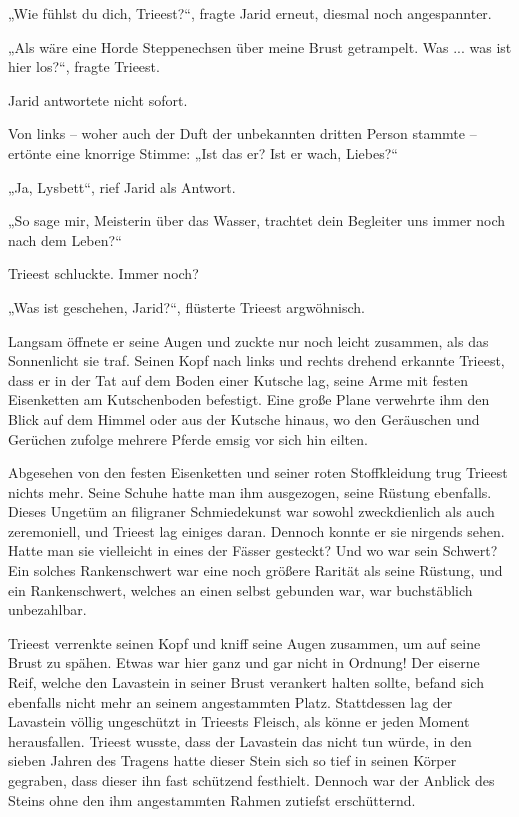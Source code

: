 „Wie fühlst du dich, Trieest?“, fragte Jarid erneut, diesmal noch angespannter.

„Als wäre eine Horde Steppenechsen über meine Brust getrampelt. Was ... was ist hier los?“, fragte Trieest.

Jarid antwortete nicht sofort.

Von links – woher auch der Duft der unbekannten dritten Person stammte – ertönte eine knorrige Stimme: „Ist das er? Ist er wach, Liebes?“

„Ja, Lysbett“, rief Jarid als Antwort.

„So sage mir, Meisterin über das Wasser, trachtet dein Begleiter uns immer noch nach dem Leben?“

Trieest schluckte. Immer noch?

„Was ist geschehen, Jarid?“, flüsterte Trieest argwöhnisch.

Langsam öffnete er seine Augen und zuckte nur noch leicht zusammen, als das Sonnenlicht sie traf. Seinen Kopf nach links und rechts drehend erkannte Trieest, dass er in der Tat auf dem Boden einer Kutsche lag, seine Arme mit festen Eisenketten am Kutschenboden befestigt. Eine große Plane verwehrte ihm den Blick auf dem Himmel oder aus der Kutsche hinaus, wo den Geräuschen und Gerüchen zufolge mehrere Pferde emsig vor sich hin eilten.

Abgesehen von den festen Eisenketten und seiner roten Stoffkleidung trug Trieest nichts mehr. Seine Schuhe hatte man ihm ausgezogen, seine Rüstung ebenfalls. Dieses Ungetüm an filigraner Schmiedekunst war sowohl zweckdienlich als auch zeremoniell, und Trieest lag einiges daran. Dennoch konnte er sie nirgends sehen. Hatte man sie vielleicht in eines der Fässer gesteckt? Und wo war sein Schwert? Ein solches Rankenschwert war eine noch größere Rarität als seine Rüstung, und ein Rankenschwert, welches an einen selbst gebunden war, war buchstäblich unbezahlbar.

Trieest verrenkte seinen Kopf und kniff seine Augen zusammen, um auf seine Brust zu spähen. Etwas war hier ganz und gar nicht in Ordnung! Der eiserne Reif, welche den Lavastein in seiner Brust verankert halten sollte, befand sich ebenfalls nicht mehr an seinem angestammten Platz. Stattdessen lag der Lavastein völlig ungeschützt in Trieests Fleisch, als könne er jeden Moment herausfallen. Trieest wusste, dass der Lavastein das nicht tun würde, in den sieben Jahren des Tragens hatte dieser Stein sich so tief in seinen Körper gegraben, dass dieser ihn fast schützend festhielt. Dennoch war der Anblick des Steins ohne den ihm angestammten Rahmen zutiefst erschütternd.

